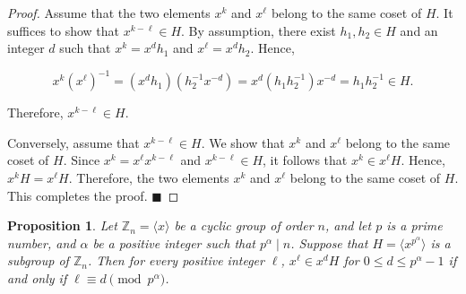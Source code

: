 \documentclass[12pt]{article}
\newtheorem{prop}[formula]{Proposition}
\begin{document}
  \begin{proof}
  	Assume that the two elements $x^k$ and $x^\ell$ belong to the same coset of $H$. It suffices to show that $x^{k-\ell}\in H$. By assumption, there exist $h_1,h_2\in H$ and an integer $d$ such that $x^k=x^dh_1$ and $x^\ell=x^dh_2$. Hence,
  	
  	\[
  	x^k(x^\ell)^{-1}
  	=(x^dh_1)(h_2^{-1}x^{-d})
  	=x^d(h_1h_2^{-1})x^{-d}
  	=h_1h_2^{-1}\in H.
  	\]
  	
  	Therefore, $x^{k-\ell}\in H$.
  	
  	\noindent Conversely, assume that $x^{k-\ell}\in H$. We show that $x^k$ and $x^\ell$ belong to the same coset of $H$. Since $x^k=x^\ell x^{k-\ell}$ and $x^{k-\ell}\in H$, it follows that $x^k\in x^\ell H$. Hence, $x^kH=x^\ell H$. Therefore, the two elements $x^k$ and $x^\ell$ belong to the same coset of $H$. This completes the proof.
  	\hfill$\blacksquare$
  \end{proof}
  \begin{prop}\label{prop:coset}
  	Let $\mathbb{Z}_n=\langle x\rangle$ be a cyclic group of order $n$, and let $p$ is a prime number, and $\alpha$ be a positive integer such that $p^\alpha\mid n$. Suppose that $H=\langle x^{p^\alpha}\rangle$ is a subgroup of $\mathbb{Z}_n$. Then for every positive integer $\ell$, $x^\ell\in x^dH$ for $0\le d\le p^\alpha-1$ if and only if $\ell\equiv d\pmod{p^\alpha}$.
  \end{prop}
\end{document}
